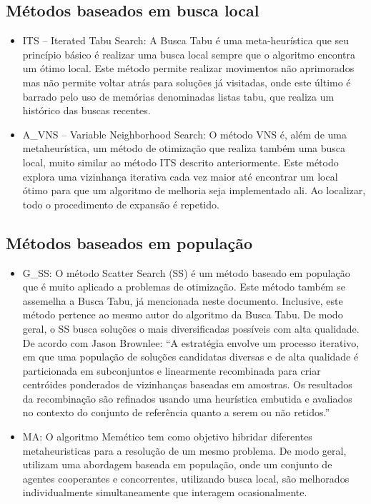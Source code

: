 \documentclass[12pt]{article}
\begin{document}
\subsection{Métodos baseados em busca local}

\begin{itemize}
    \item ITS – Iterated Tabu Search: A Busca Tabu é uma meta-heurística que seu princípio básico é realizar uma busca local sempre que o algoritmo encontra um ótimo local. Este método permite realizar movimentos não aprimorados mas não permite voltar atrás para soluções já visitadas, onde este último é barrado pelo uso de memórias denominadas listas tabu, que realiza um histórico das buscas recentes.
    \item A\_VNS – Variable Neighborhood Search: O método VNS é, além de uma metaheurística, um método de otimização que realiza também uma busca local, muito similar ao método ITS descrito anteriormente. Este método explora uma vizinhança iterativa cada vez maior até encontrar um local ótimo para que um algoritmo de melhoria seja implementado ali. Ao localizar, todo o procedimento de expansão é repetido.
\end{itemize}

\subsection{Métodos baseados em população}

\begin{itemize}
    \item G\_SS: O método Scatter Search (SS) é um método baseado em população que é muito aplicado a problemas de otimização. Este método também se assemelha a Busca Tabu, já mencionada neste documento. Inclusive, este método pertence ao mesmo autor do algoritmo da Busca Tabu. De modo geral, o SS busca soluções o mais diversificadas possíveis com alta qualidade. De acordo com Jason Brownlee: “A estratégia envolve um processo iterativo, em que uma população de soluções candidatas diversas e de alta qualidade é particionada em subconjuntos e linearmente recombinada para criar centróides ponderados de vizinhanças baseadas em amostras. Os resultados da recombinação são refinados usando uma heurística embutida e avaliados no contexto do conjunto de referência quanto a serem ou não retidos.”
    \item MA: O algoritmo Memético tem como objetivo hibridar diferentes metaheuristicas para a resolução de um mesmo problema.  De modo geral, utilizam uma abordagem baseada em população, onde um conjunto de agentes cooperantes e concorrentes, utilizando busca local, são melhorados individualmente simultaneamente que interagem ocasionalmente.
\end{itemize}
\end{document}
